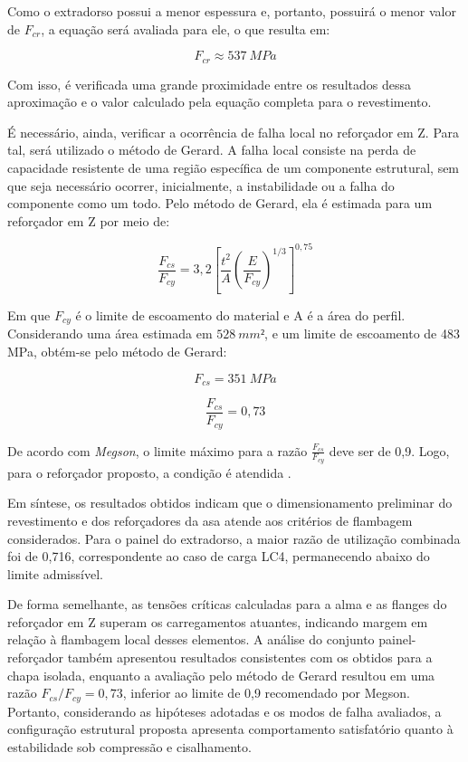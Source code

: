 Como o extradorso possui a menor espessura e, portanto, possuirá o menor valor de $F_{cr}$, a equação será avaliada para ele, o que resulta em:

\begin{equation}
    F_{cr}\approx 537\ MPa
\end{equation}

Com isso, é verificada uma grande proximidade entre os resultados dessa aproximação e o valor calculado pela equação completa para o revestimento.

É necessário, ainda, verificar a ocorrência de falha local no reforçador em Z. Para tal, será utilizado o método de Gerard. A falha local consiste na perda de capacidade resistente de uma região específica de um componente estrutural, sem que seja necessário ocorrer, inicialmente, a instabilidade ou a falha do componente como um todo. Pelo método de Gerard, ela é estimada para um reforçador em Z por meio de:

\begin{equation}
    \frac{F_{cs}}{F_{cy}}=3,2\left[\frac{t^2}{A}\left(\frac{E}{F_{cy}}\right)^{1/3}\right]^{0,75}
\end{equation}

Em que $F_{cy}$ é o limite de escoamento do material e A é a área do perfil. Considerando uma área estimada em $528\ mm²$, e um limite de escoamento de 483 MPa, obtém-se pelo método de Gerard:

\begin{equation}
    F_{cs}= 351 \ MPa
\end{equation}

\begin{equation}
    \frac{F_{cs}}{F_{cy}}= 0,73
\end{equation}

De acordo com \textit{Megson}, o limite máximo para a razão $\frac{F_{cs}}{F_{cy}}$ deve ser de 0,9. Logo, para o reforçador proposto, a condição é atendida \cite{megson2007}.

Em síntese, os resultados obtidos indicam que o dimensionamento preliminar do revestimento e dos reforçadores da asa atende aos critérios de flambagem considerados. Para o painel do extradorso, a maior razão de utilização combinada foi de 0,716, correspondente ao caso de carga LC4, permanecendo abaixo do limite admissível. 

De forma semelhante, as tensões críticas calculadas para a alma e as flanges do reforçador em Z superam os carregamentos atuantes, indicando margem em relação à flambagem local desses elementos. A análise do conjunto painel-reforçador também apresentou resultados consistentes com os obtidos para a chapa isolada, enquanto a avaliação pelo método de Gerard resultou em uma razão \(F_{cs}/F_{cy}=0,73\), inferior ao limite de 0,9 recomendado por Megson. Portanto, considerando as hipóteses adotadas e os modos de falha avaliados, a configuração estrutural proposta apresenta comportamento satisfatório quanto à estabilidade sob compressão e cisalhamento.

